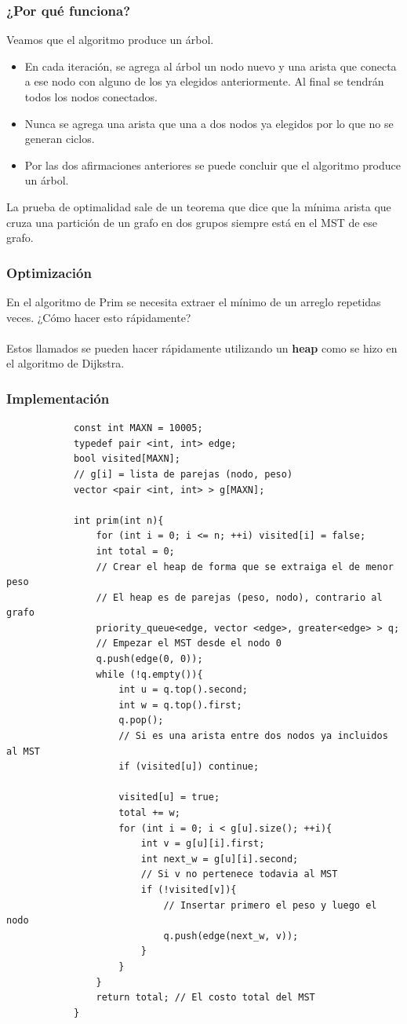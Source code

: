 \documentclass{beamer}
\begin{document}
	\begin{frame}
		\frametitle{¿Por qué funciona?}
		Veamos que el algoritmo produce un árbol.
		\begin{itemize}
			\item En cada iteración, se agrega al árbol un nodo nuevo y una arista que conecta a ese nodo con alguno de los ya elegidos anteriormente. Al final se tendrán todos los nodos conectados.
			\item Nunca se agrega una arista que una a dos nodos ya elegidos por lo que no se generan ciclos.
			\item Por las dos afirmaciones anteriores se puede concluir que el algoritmo produce un árbol.
		\end{itemize}
		La prueba de optimalidad sale de un teorema que dice que la mínima arista que cruza una partición de un grafo en dos grupos siempre está en el MST de ese grafo.
	\end{frame}
	
	\begin{frame}
		\frametitle{Optimización}
		En el algoritmo de Prim se necesita extraer el mínimo de un arreglo repetidas veces. ¿Cómo hacer esto rápidamente?\\ \quad \\
		\pause
		Estos llamados se pueden hacer rápidamente utilizando un \textbf{heap} como se hizo en el algoritmo de Dijkstra.
	\end{frame}
	
	\begin{frame}
		\frametitle{Implementación}
		\begin{lstlisting}
			const int MAXN = 10005;
			typedef pair <int, int> edge;
			bool visited[MAXN];
			// g[i] = lista de parejas (nodo, peso)
			vector <pair <int, int> > g[MAXN]; 

			int prim(int n){
			    for (int i = 0; i <= n; ++i) visited[i] = false;
			    int total = 0;
			    // Crear el heap de forma que se extraiga el de menor peso
			    // El heap es de parejas (peso, nodo), contrario al grafo
			    priority_queue<edge, vector <edge>, greater<edge> > q;
			    // Empezar el MST desde el nodo 0
			    q.push(edge(0, 0));
			    while (!q.empty()){
			        int u = q.top().second;
			        int w = q.top().first;
			        q.pop();
			        // Si es una arista entre dos nodos ya incluidos al MST
			        if (visited[u]) continue;

			        visited[u] = true;
			        total += w;
			        for (int i = 0; i < g[u].size(); ++i){
			            int v = g[u][i].first;
			            int next_w = g[u][i].second;
			            // Si v no pertenece todavia al MST
			            if (!visited[v]){
			                // Insertar primero el peso y luego el nodo
			                q.push(edge(next_w, v));    
			            }    
			        }
			    }
			    return total; // El costo total del MST
			}
		\end{lstlisting}
	\end{frame}
	
\end{document}
